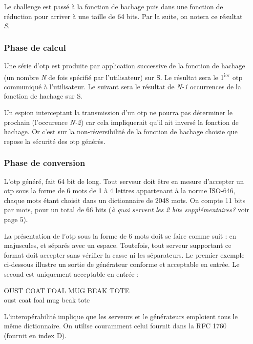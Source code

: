 \documentclass{../res/univ-projet}
\begin{document}
      Le challenge est passé à la fonction de hachage puis dans une fonction
      de réduction pour arriver à une taille de 64 bits. Par la suite,
      on notera ce résultat \emph{S}.

    \subsubsection{Phase de calcul}
      Une série d'otp est produite par application successive de la fonction de 
hachage (un nombre \emph{N} de fois spécifié par l'utilisateur) sur S. Le 
résultat sera le 1\textsuperscript{ier} otp communiqué à l'utilisateur. Le 
suivant sera le résultat de \emph{N-1} occurrences de la fonction de hachage 
sur 
S. 

      Un espion interceptant la transmission d'un otp ne pourra pas déterminer 
le prochain (l'occurence \emph{N-2}) car cela impliquerait qu'il ait inversé la 
fonction de hachage. Or c'est sur la non-réversibilité de la fonction de 
hachage 
choisie que repose la sécurité des otp générés.\\



    \subsubsection{Phase de conversion}
        L'otp généré, fait 64 bit de long. Tout serveur doit être en mesure 
d'accepter un otp sous la forme de 6 mots de 1 à 4 lettres appartenant à la 
norme ISO-646, chaque mots étant choisit dans un dictionnaire de 2048 mots. On compte 
11 
bits par mots, pour un total de 66 bits (\emph{à quoi servent les 2 bits 
supplémentaires?} voir page 5).

        La présentation de l'otp sous la forme de 6 mots doit se faire comme 
suit : en majuscules, et séparés avec un espace. Toutefois, tout serveur 
supportant ce format doit accepter sans vérifier la casse ni les séparateurs. 
Le 
premier exemple ci-dessous illustre un sortie de générateur conforme et 
acceptable en entrée. Le second est uniquement acceptable en entrée :
        \begin{center}
            OUST COAT FOAL MUG BEAK TOTE\\
            oust coat foal mug beak tote
        \end{center}

        L'interopérabilité implique que les serveurs et le générateurs 
emploient 
tous le même dictionnaire. On utilise couramment celui fournit dans la RFC 1760 
(fournit en index D).
\end{document}
